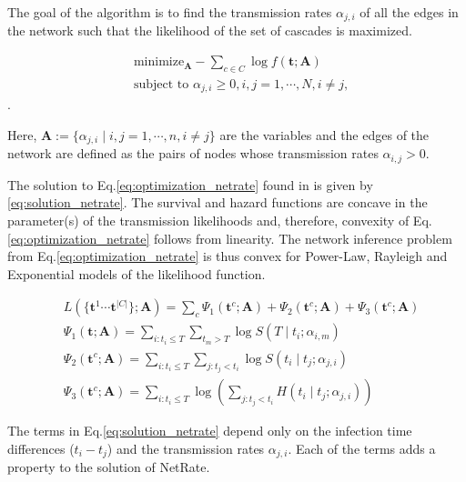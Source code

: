 \documentclass[11pt]{article}
\begin{document}
The goal of the algorithm is to find the transmission rates $\alpha_{j,i}$ of all the edges in the network such that the likelihood of the set of cascades is maximized.

\begin{subequations}
\label{eq:optimization_netrate}
\begin{align}
& \text{minimize}_{\textbf{A}} -\sum_{c\in C}\log f(\textbf{t};\textbf{A})\\
& \text{subject to } \alpha _{j,i}\geq 0,i,j=1,\cdots,N,i\neq j,
\end{align}
\end{subequations}.

Here, $\textbf{A}:=\{\alpha _{j,i}\mid i,j=1,\cdots,n,i\neq j\}$ are the variables and the edges of the network are defined as the pairs of nodes whose transmission rates $\alpha _{i,j}>0$. 

The solution to Eq.\ref{eq:optimization_netrate} found in \cite{rodriguez2011uncovering} is given by \ref{eq:solution_netrate}. The survival and hazard functions are concave in the parameter(s) of the transmission likelihoods and, therefore, convexity of Eq.\ref{eq:optimization_netrate} follows from linearity. The network inference problem from Eq.\ref{eq:optimization_netrate} is thus convex for Power-Law, Rayleigh and Exponential models of the likelihood function.

\begin{subequations}
\begin{align}
\label{eq:solution_netrate}
& L(\{\textbf{t}^{1}\cdots \textbf{t}^{|C|}\};\textbf{A})=\sum _{c}\Psi_{1}(\textbf{t}^{c};\textbf{A})+\Psi_{2}(\textbf{t}^{c};\textbf{A})+\Psi_{3}(\textbf{t}^{c};\textbf{A})\\
& \Psi_{1}(\textbf{t};\textbf{A})=\sum _{i:t_{i}\leq T}\sum _{t_{m}>T}\log S(T\mid t_{i};\alpha _{i,m})\\
& \Psi _{2}(\textbf{t}^{c};\textbf{A})=\sum_{i:t_{i}\leq T} \sum_ {j:t_{j}<t_{i}}\log S(t_{i}\mid t_{j};\alpha_{j,i})\\
& \Psi _{3}(\textbf{t}^{c};\textbf{A})=\sum_{i:t_{i}\leq T} \log (\sum_{j:t_{j}<t_{i}} H(t_{i}\mid t_{j};\alpha_{j,i}))
\end{align}
\end{subequations}

The terms in Eq.\ref{eq:solution_netrate} depend only on the infection time differences ($t_{i}-t_{j}$) and the transmission rates $\alpha_{j,i}$. Each of the terms adds a property to the solution of NetRate.
\end{document}

